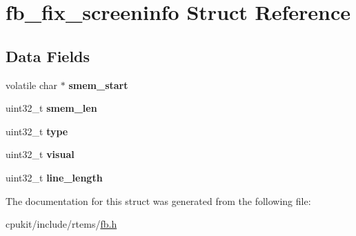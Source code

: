 \hypertarget{structfb__fix__screeninfo}{}\section{fb\+\_\+fix\+\_\+screeninfo Struct Reference}
\label{structfb__fix__screeninfo}
\subsection*{Data Fields}
\begin{DoxyCompactItemize}
\item 
\mbox{\label{structfb__fix__screeninfo_adc98c5a0d33b5668c43f7d33717cb046}} 
volatile char $\ast$ {\bfseries smem\+\_\+start}
\item 
\mbox{\label{structfb__fix__screeninfo_ad775a2111ea44d807ea96854f02989e7}} 
uint32\+\_\+t {\bfseries smem\+\_\+len}
\item 
\mbox{\label{structfb__fix__screeninfo_a62fa12f41c4892509862466643708350}} 
uint32\+\_\+t {\bfseries type}
\item 
\mbox{\label{structfb__fix__screeninfo_a21c977d5e9c783bd160f290b3223f972}} 
uint32\+\_\+t {\bfseries visual}
\item 
\mbox{\label{structfb__fix__screeninfo_a8de0ff19d08381b293dc00736699aa8e}} 
uint32\+\_\+t {\bfseries line\+\_\+length}
\end{DoxyCompactItemize}


The documentation for this struct was generated from the following file\+:\begin{DoxyCompactItemize}
\item 
cpukit/include/rtems/\mbox{\hyperlink{fb_8h}{fb.\+h}}\end{DoxyCompactItemize}
